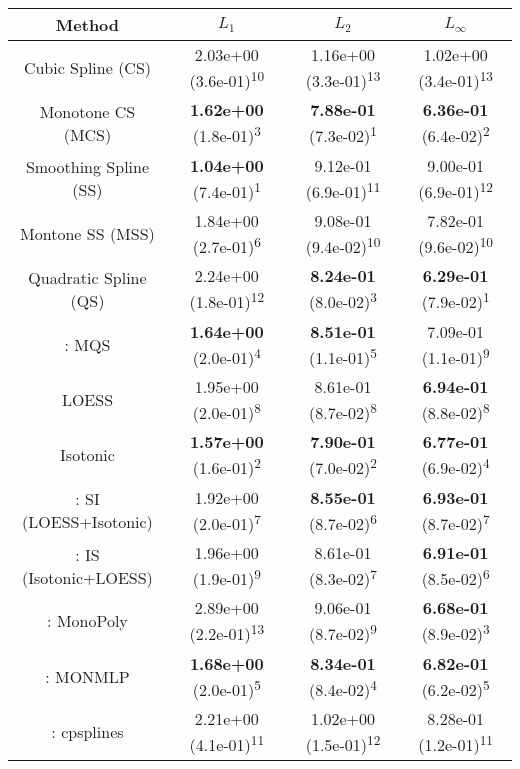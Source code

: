 \begin{tabular}{cccc}
\toprule
Method&$L_1$&$L_2$&$L_\infty$\tabularnewline
\midrule
Cubic Spline (CS)& 2.03e+00 (3.6e-01)\textsuperscript{10}& 1.16e+00 (3.3e-01)\textsuperscript{13}& 1.02e+00 (3.4e-01)\textsuperscript{13}\tabularnewline
Monotone CS (MCS)& \textbf{1.62e+00} (1.8e-01)\textsuperscript{3}& \textbf{7.88e-01} (7.3e-02)\textsuperscript{1}& \textbf{6.36e-01} (6.4e-02)\textsuperscript{2}\tabularnewline
Smoothing Spline (SS)& \textbf{1.04e+00} (7.4e-01)\textsuperscript{1}& 9.12e-01 (6.9e-01)\textsuperscript{11}& 9.00e-01 (6.9e-01)\textsuperscript{12}\tabularnewline
Montone SS (MSS)& 1.84e+00 (2.7e-01)\textsuperscript{6}& 9.08e-01 (9.4e-02)\textsuperscript{10}& 7.82e-01 (9.6e-02)\textsuperscript{10}\tabularnewline
Quadratic Spline (QS)& 2.24e+00 (1.8e-01)\textsuperscript{12}& \textbf{8.24e-01} (8.0e-02)\textsuperscript{3}& \textbf{6.29e-01} (7.9e-02)\textsuperscript{1}\tabularnewline
\textcite{heMonotoneBsplineSmoothing1998}: MQS& \textbf{1.64e+00} (2.0e-01)\textsuperscript{4}& \textbf{8.51e-01} (1.1e-01)\textsuperscript{5}& 7.09e-01 (1.1e-01)\textsuperscript{9}\tabularnewline
LOESS& 1.95e+00 (2.0e-01)\textsuperscript{8}& 8.61e-01 (8.7e-02)\textsuperscript{8}& \textbf{6.94e-01} (8.8e-02)\textsuperscript{8}\tabularnewline
Isotonic& \textbf{1.57e+00} (1.6e-01)\textsuperscript{2}& \textbf{7.90e-01} (7.0e-02)\textsuperscript{2}& \textbf{6.77e-01} (6.9e-02)\textsuperscript{4}\tabularnewline
\textcite{mammenEstimatingSmoothMonotone1991}: SI (LOESS+Isotonic)& 1.92e+00 (2.0e-01)\textsuperscript{7}& \textbf{8.55e-01} (8.7e-02)\textsuperscript{6}& \textbf{6.93e-01} (8.7e-02)\textsuperscript{7}\tabularnewline
\textcite{mammenEstimatingSmoothMonotone1991}: IS (Isotonic+LOESS)& 1.96e+00 (1.9e-01)\textsuperscript{9}& 8.61e-01 (8.3e-02)\textsuperscript{7}& \textbf{6.91e-01} (8.5e-02)\textsuperscript{6}\tabularnewline
\textcite{murrayFastFlexibleMethods2016a}: MonoPoly& 2.89e+00 (2.2e-01)\textsuperscript{13}& 9.06e-01 (8.7e-02)\textsuperscript{9}& \textbf{6.68e-01} (8.9e-02)\textsuperscript{3}\tabularnewline
\textcite{cannonMonmlpMultilayerPerceptron2017}: MONMLP& \textbf{1.68e+00} (2.0e-01)\textsuperscript{5}& \textbf{8.34e-01} (8.4e-02)\textsuperscript{4}& \textbf{6.82e-01} (6.2e-02)\textsuperscript{5}\tabularnewline
\textcite{navarro-garciaConstrainedSmoothingOutofrange2023}: cpsplines& 2.21e+00 (4.1e-01)\textsuperscript{11}& 1.02e+00 (1.5e-01)\textsuperscript{12}& 8.28e-01 (1.2e-01)\textsuperscript{11}\tabularnewline
\bottomrule
\end{tabular}
